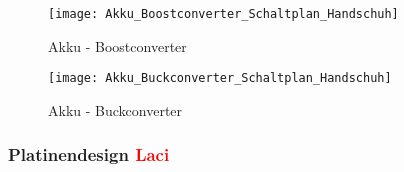 \documentclass[titlepage,12pt,twoside]{article}
\begin{document}
\begin{figure}[H]
	\begin{center}
		\scalebox{0.5}
		{\texttt{[image: Akku\_Boostconverter\_Schaltplan\_Handschuh]}}
		\caption{Akku - Boostconverter}
		\label{fig:Akku_Boostconverter_Schaltplan_Handschuh}		
	\end{center}
\end{figure}

\begin{figure}[H]
	\begin{center}
		\scalebox{0.5}
		{\texttt{[image: Akku\_Buckconverter\_Schaltplan\_Handschuh]}}
		\caption{Akku - Buckconverter}
		\label{fig:Akku_Buckconverter_Schaltplan_Handschuh}		
	\end{center}
\end{figure}

\subsubsection{Platinendesign \textcolor{red}{Laci}}
\end{document}
